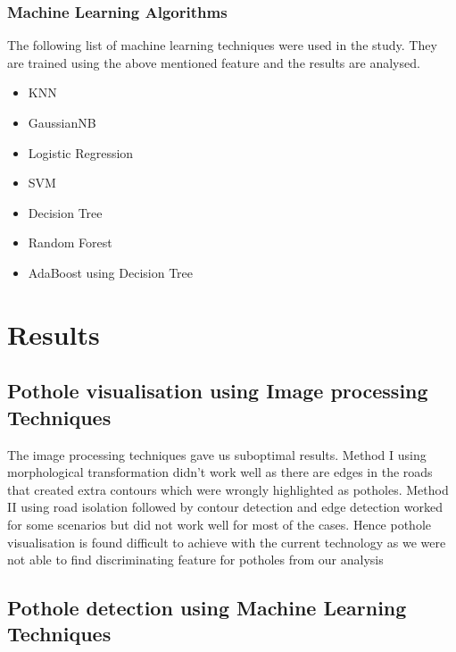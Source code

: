\documentclass[journal]{IEEEtran}
\begin{document}
\subsubsection{Machine Learning Algorithms}

The following list of machine learning techniques were used in the study. They are trained using the above mentioned feature and the results are analysed.

\begin{itemize}
\item KNN \cite{knn}
\item GaussianNB
\item Logistic Regression \cite{lr}
\item SVM \cite{svm}
\item Decision Tree \cite{dt}
\item Random Forest \cite{rf}
\item AdaBoost using Decision Tree
\end{itemize}

\section{Results}


\subsection{Pothole visualisation using Image processing Techniques}

The image processing techniques gave us suboptimal results. Method I using morphological transformation didn't work well as there are edges in the roads that created extra contours which were wrongly highlighted as potholes. Method II using road isolation followed by contour detection and edge detection worked for some scenarios but did not work well for most of the cases. Hence pothole visualisation is found difficult to achieve with the current technology as we were not able to find discriminating feature for potholes from our analysis

\subsection{Pothole detection using Machine Learning Techniques}
\end{document}
